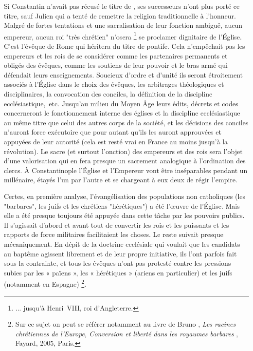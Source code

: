 Si Constantin n'avait pas récusé le titre de , ses successeurs n'ont plus porté ce titre, sauf Julien qui a tenté de remettre la religion traditionnelle à l'honneur. Malgré de fortes tentations et une sacralisation de leur fonction ambiguë, aucun empereur, aucun roi "très chrétien" n'osera
\footnote{... jusqu'à Henri~VIII, roi d'Angleterre.} 
se proclamer dignitaire de l'Église. C'est l'évêque de Rome qui héritera du titre de pontife. Cela n'empêchait pas les empereurs et les rois de se considérer comme les partenaires permanents et obligés des évêques, comme les soutiens de leur pouvoir et le bras armé qui défendait leurs enseignements. Soucieux d'ordre et d'unité ils seront étroitement associés à l'Église dans le choix des évêques, les arbitrages théologiques et disciplinaires, la convocation des conciles, la définition de la discipline ecclésiastique,~etc. Jusqu'au milieu du Moyen Âge leurs édits, décrets et codes concerneront le fonctionnement interne des églises et la discipline ecclésiastique au même titre que celui des autres corps de la société, et les décisions des conciles n'auront force exécutoire que pour autant qu'ils les auront approuvées et appuyées de leur autorité (cela est resté vrai en France au moins jusqu'à la révolution). Le sacre (et surtout l'onction) des empereurs et des rois sera l'objet d'une valorisation qui en fera presque un sacrement analogique à l'ordination des clercs. À Constantinople l'Église et l'Empereur vont être inséparables pendant un millénaire, étayés l'un par l'autre et se chargeant à eux deux de régir l'empire. 

Certes, en première analyse, l'évangélisation des populations non catholiques (les "barbares", les juifs et les chrétiens "hérétiques") a été l'œuvre de l'Église. Mais elle a été presque toujours été appuyée dans cette tâche par les pouvoirs publics. Il s'agissait d'abord et avant tout de convertir les rois et les puissants et les rapports de force militaires facilitaient les choses. Le reste suivait presque mécaniquement. En dépit de la doctrine ecclésiale qui voulait que les candidats au baptême agissent librement et de leur propre initiative, ils l'ont parfois fait sous la contrainte, et tous les évêques n'ont pas protesté contre les pressions subies par les « païens », les « hérétiques » (ariens en particulier) et les juifs (notamment en Espagne)
\footnote{Sur ce sujet on peut se référer notamment au livre de Bruno , \emph{Les racines chrétiennes de l'Europe, Conversion et liberté dans les royaumes barbares }, Fayard, 2005, Paris.}. 

